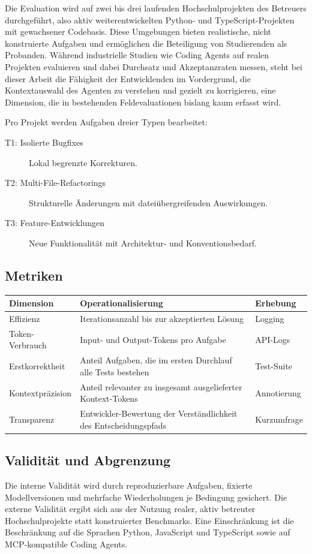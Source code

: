 Die Evaluation wird auf zwei bis drei laufenden Hochschulprojekten des Betreuers durchgeführt, also aktiv weiterentwickelten Python- und TypeScript-Projekten mit gewachsener Codebasis. Diese Umgebungen bieten realistische, nicht konstruierte Aufgaben und ermöglichen die Beteiligung von Studierenden als Probanden. Während industrielle Studien wie \textcite{hula2024} Coding Agents auf realen Projekten evaluieren und dabei Durchsatz und Akzeptanzraten messen, steht bei dieser Arbeit die Fähigkeit der Entwicklenden im Vordergrund, die Kontextauswahl des Agenten zu verstehen und gezielt zu korrigieren, eine Dimension, die in bestehenden Feldevaluationen bislang kaum erfasst wird.

Pro Projekt werden Aufgaben dreier Typen bearbeitet:
\begin{description}
  \item[T1: Isolierte Bugfixes] Lokal begrenzte Korrekturen.
  \item[T2: Multi-File-Refactorings] Strukturelle Änderungen mit dateiübergreifenden Auswirkungen.
  \item[T3: Feature-Entwicklungen] Neue Funktionalität mit Architektur- und Konventionsbedarf.
\end{description}

\subsection*{Metriken}

\begin{tabularx}{\linewidth}{@{}lXl@{}}
  \toprule
  \textbf{Dimension} & \textbf{Operationalisierung} & \textbf{Erhebung} \\
  \midrule
  Effizienz       & Iterationsanzahl bis zur akzeptierten Lösung & Logging \\
  Token-Verbrauch & Input- und Output-Tokens pro Aufgabe & API-Logs \\
  Erstkorrektheit & Anteil Aufgaben, die im ersten Durchlauf alle Tests bestehen & Test-Suite \\
  Kontextpräzision & Anteil relevanter zu insgesamt ausgelieferter Kontext-Tokens & Annotierung \\
  Transparenz & Entwickler-Bewertung der Verständlichkeit des Entscheidungspfads & Kurzumfrage \\
  \bottomrule
\end{tabularx}

\subsection*{Validität und Abgrenzung}

Die interne Validität wird durch reproduzierbare Aufgaben, fixierte Modellversionen und mehrfache Wiederholungen je Bedingung gesichert. Die externe Validität ergibt sich aus der Nutzung realer, aktiv betreuter Hochschulprojekte statt konstruierter Benchmarks. Eine Einschränkung ist die Beschränkung auf die Sprachen Python, JavaScript und TypeScript sowie auf MCP-kompatible Coding Agents.
